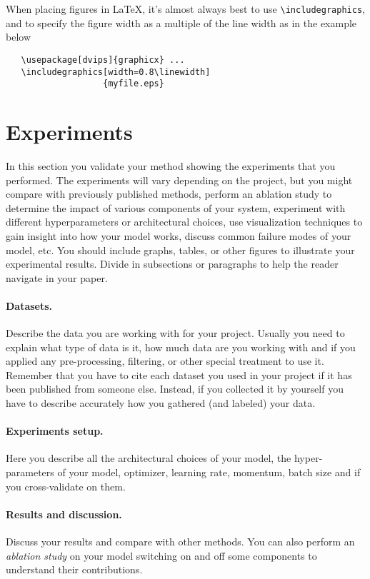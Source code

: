 \documentclass[10pt,twocolumn,letterpaper]{article}
\begin{document}
When placing figures in \LaTeX, it's almost always best to use
\verb+\includegraphics+, and to specify the  figure width as a multiple of
the line width as in the example below
{\small\begin{verbatim}
   \usepackage[dvips]{graphicx} ...
   \includegraphics[width=0.8\linewidth]
                   {myfile.eps}
\end{verbatim}
}

\section{Experiments}
In this section you validate your method showing the experiments that you performed. The experiments will vary depending on the project, but you might compare with previously published methods, perform an ablation study to determine the impact of various components of your system, experiment with different hyperparameters or architectural choices, use visualization techniques to gain insight into how your model works, discuss common failure modes of your model, etc. You should include graphs, tables, or other figures to illustrate your experimental results. Divide in subsections or paragraphs to help the reader navigate in your paper.

\paragraph{Datasets.}
Describe the data you are working with for your project. Usually you need to explain what type of data is it, how much data are you working with and if you applied any pre-processing, filtering, or other special treatment to use it. Remember that you have to cite each dataset you used in your project if it has been published from someone else. Instead, if you collected it by yourself you have to describe accurately how you gathered (and labeled) your data.

\paragraph{Experiments setup.}
Here you describe all the architectural choices of your model, the hyper-parameters of your model, \eg optimizer, learning rate, momentum, batch size and if you cross-validate on them.

\paragraph{Results and discussion.}
Discuss your results and compare with other methods. You can also perform an \emph{ablation study} on your model switching on and off some components to understand their contributions.
\end{document}
